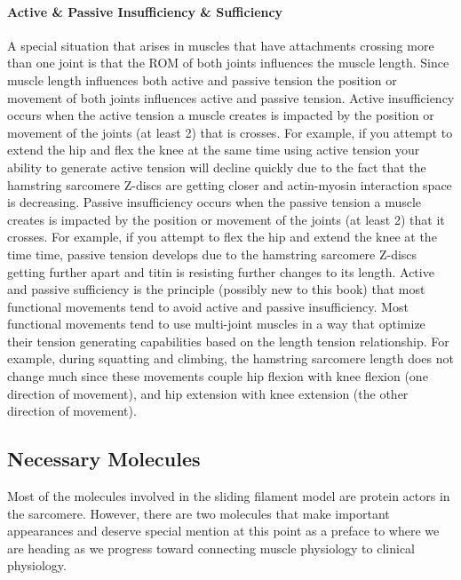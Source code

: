 \paragraph{Active \& Passive Insufficiency & Sufficiency}
A special situation that arises in muscles that have attachments crossing more than one joint is that the ROM of both joints influences the muscle length. Since muscle length influences both active and passive tension the position or movement of both joints influences active and passive tension.
Active insufficiency occurs when the active tension a muscle creates is impacted by the position or movement of the joints (at least 2) that is crosses. For example, if you attempt to extend the hip and flex the knee at the same time using active tension your ability to generate active tension will decline quickly due to the fact that the hamstring sarcomere Z-discs are getting closer and actin-myosin interaction space is decreasing.
Passive insufficiency occurs when the passive tension a muscle creates is impacted by the position or movement of the joints (at least 2) that it crosses. For example, if you attempt to flex the hip and extend the knee at the time time, passive tension develops due to the hamstring sarcomere Z-discs getting further apart and titin is resisting further changes to its length.\footnotemark{}
Active and passive sufficiency is the principle (possibly new to this book) that most functional movements tend to avoid active and passive insufficiency. Most functional movements tend to use multi-joint muscles in a way that optimize their tension generating capabilities based on the length tension relationship. For example, during squatting and climbing, the hamstring sarcomere length does not change much since these movements couple hip flexion with knee flexion (one direction of movement), and hip extension with knee extension (the other direction of movement).

\subsection{Necessary Molecules}
Most of the molecules involved in the sliding filament model are protein actors in the sarcomere. However, there are two molecules that make important appearances and deserve special mention at this point as a preface to where we are heading as we progress toward connecting muscle physiology to clinical physiology.

